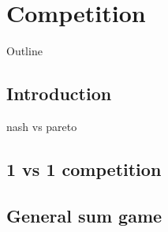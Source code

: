 \chapter{Competition}\label{ch:competition}
\begin{chapter_outline}
Outline
\end{chapter_outline}

\section{Introduction}

nash vs pareto

\section{1 vs 1 competition}
\section{General sum game}